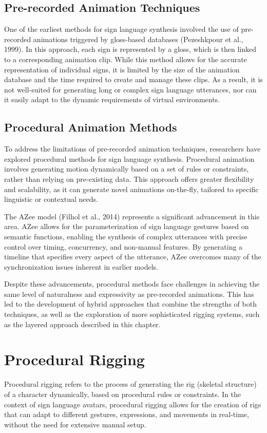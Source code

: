 \documentclass[../../main.tex]{subfiles}
\begin{document}
\subsection{Pre-recorded Animation Techniques}
One of the earliest methods for sign language synthesis involved the use of pre-recorded animations triggered by gloss-based databases (Pezeshkpour et al., 1999). In this approach, each sign is represented by a gloss, which is then linked to a corresponding animation clip. While this method allows for the accurate representation of individual signs, it is limited by the size of the animation database and the time required to create and manage these clips. As a result, it is not well-suited for generating long or complex sign language utterances, nor can it easily adapt to the dynamic requirements of virtual environments.

\subsection{Procedural Animation Methods}
To address the limitations of pre-recorded animation techniques, researchers have explored procedural methods for sign language synthesis. Procedural animation involves generating motion dynamically based on a set of rules or constraints, rather than relying on pre-existing data. This approach offers greater flexibility and scalability, as it can generate novel animations on-the-fly, tailored to specific linguistic or contextual needs.

The AZee model (Filhol et al., 2014) represents a significant advancement in this area. AZee allows for the parameterization of sign language gestures based on semantic functions, enabling the synthesis of complex utterances with precise control over timing, concurrency, and non-manual features. By generating a timeline that specifies every aspect of the utterance, AZee overcomes many of the synchronization issues inherent in earlier models.

Despite these advancements, procedural methods face challenges in achieving the same level of naturalness and expressivity as pre-recorded animations. This has led to the development of hybrid approaches that combine the strengths of both techniques, as well as the exploration of more sophisticated rigging systems, such as the layered approach described in this chapter.

\section{Procedural Rigging}
Procedural rigging refers to the process of generating the rig (skeletal structure) of a character dynamically, based on procedural rules or constraints. In the context of sign language avatars, procedural rigging allows for the creation of rigs that can adapt to different gestures, expressions, and movements in real-time, without the need for extensive manual setup.
\end{document}
